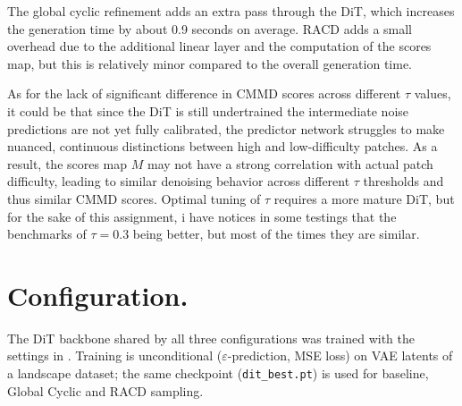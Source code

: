 \documentclass[10pt]{article}
\theoremstyle{plain}
\begin{document}
\begin{remark}
    The global cyclic refinement adds an extra pass through the DiT, which increases the generation time by about 0.9 seconds on average. RACD adds a small overhead due to the additional linear layer and the computation of the scores map, but this is relatively minor compared to the overall generation time. 

    As for the lack of significant difference in CMMD scores across different \(\tau\) values, it could be that since the DiT is still undertrained the intermediate noise predictions are not yet fully calibrated, the predictor network struggles to make nuanced, continuous distinctions between high and low-difficulty patches. As a result, the scores map \(M\) may not have a strong correlation with actual patch difficulty, leading to similar denoising behavior across different \(\tau\) thresholds and thus similar CMMD scores. Optimal tuning of \(\tau\) requires a more mature DiT, but for the sake of this assignment, i have notices in some testings that the benchmarks of \( \boxed{\tau = 0.3}\) being better, but most of the times they are similar.
\end{remark}

\section{Configuration.}

The DiT backbone shared by all three configurations was trained with the settings in
. Training is unconditional ($\varepsilon$-prediction, MSE loss) on
VAE latents of a landscape dataset; the same checkpoint (\texttt{dit\_best.pt}) is used for
baseline, Global Cyclic and RACD sampling.
\end{document}
